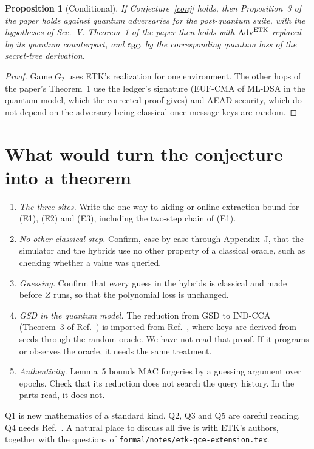 \documentclass[aps,prx,reprint,superscriptaddress,nofootinbib,floatfix]{revtex4-2}
\newtheorem{proposition}{Proposition}
\theoremstyle{remark}
\begin{document}
\begin{proposition}[Conditional]
If Conjecture~\ref{conj} holds, then Proposition~3 of the paper holds against quantum adversaries for the post-quantum suite, with the hypotheses of Sec.~V. Theorem~1 of the paper then holds with $\mathrm{Adv}^{\rm ETK}$ replaced by its quantum counterpart, and $\epsilon_{\rm RO}$ by the corresponding quantum loss of the secret-tree derivation.
\end{proposition}
\begin{proof}
Game $G_2$ uses ETK's realization for one environment. The other hops of the paper's Theorem~1 use the ledger's signature (EUF-CMA of ML-DSA in the quantum model, which the corrected proof gives) and AEAD security, which do not depend on the adversary being classical once message keys are random.
\end{proof}

\section{What would turn the conjecture into a theorem}\label{sec:checks}

\begin{enumerate}
\item[Q1.] \emph{The three sites.} Write the one-way-to-hiding or online-extraction bound for (E1), (E2) and (E3), including the two-step chain of (E1).
\item[Q2.] \emph{No other classical step.} Confirm, case by case through Appendix~J, that the simulator and the hybrids use no other property of a classical oracle, such as checking whether a value was queried.
\item[Q3.] \emph{Guessing.} Confirm that every guess in the hybrids is classical and made before $Z$ runs, so that the polynomial loss is unchanged.
\item[Q4.] \emph{GSD in the quantum model.} The reduction from GSD to IND-CCA (Theorem~3 of Ref.~\cite{etk}) is imported from Ref.~\cite{active-cgka}, where keys are derived from seeds through the random oracle. We have not read that proof. If it programs or observes the oracle, it needs the same treatment.
\item[Q5.] \emph{Authenticity.} Lemma~5 bounds MAC forgeries by a guessing argument over epochs. Check that its reduction does not search the query history. In the parts read, it does not.
\end{enumerate}
Q1 is new mathematics of a standard kind. Q2, Q3 and Q5 are careful reading. Q4 needs Ref.~\cite{active-cgka}. A natural place to discuss all five is with ETK's authors, together with the questions of \texttt{formal/notes/etk-gce-extension.tex}.
\end{document}
